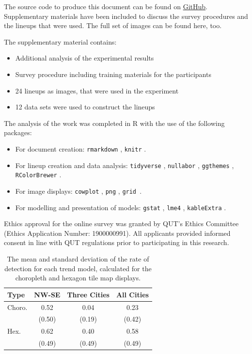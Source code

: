 \documentclass[times, doublespace]{anzsauth}
\begin{document}
The source code to produce this document can be found on
\href{https://github.com/srkobakian/experiment/paper}{GitHub}.
Supplementary materials have been included to discuss the survey
procedures and the lineups that were used. The full set of images can be
found here, too.

The supplementary material contains:

\begin{itemize}
 \item
  Additional analysis of the experimental results
\item
  Survey procedure including training materials for the participants
\item
  24 lineups as images, that were used in the experiment
\item
  12 data sets were used to construct the lineups
\end{itemize}

The analysis of the work was completed in R
\citep{RCore} with the use of the following packages:

\begin{itemize}
 \item
  For document creation:  \texttt{rmarkdown} \citep{rmarkdown},
   \texttt{knitr}
  \citep{knitr}.
\item
  For lineup creation and data analysis:  \texttt{tidyverse}
  \citep{tidyverse},  \texttt{nullabor}
  \citep{nullabor},  \texttt{ggthemes}
  \citep{ggthemes},  \texttt{RColorBrewer}
 \citep{RColorBrewer}.
\item
  For image displays:  \texttt{cowplot} \citep{cowplot},  \texttt{png}
  \citep{png},  \texttt{grid }\citep{grid}.
\item
  For modelling and presentation of models:  \texttt{gstat}
 \citep{gstat},  \texttt{lme4} \citep{lme4},
   \texttt{kableExtra} \citep{kableExtra}.
\end{itemize}

Ethics approval for the online survey was granted by QUT's Ethics
Committee (Ethics Application Number: 1900000991). All applicants
provided informed consent in line with QUT regulations prior to
participating in this research.




\newpage

\begin{table}[t]

\caption{\label{tab:desc-stats}The mean and standard deviation of the rate of detection for each trend model, calculated for the choropleth and hexagon tile map displays.}
\centering
\begin{tabular}[t]{lccc}
\toprule
Type & NW-SE & Three Cities & All Cities\\
\midrule
Choro. & 0.52 & 0.04 & 0.23\\
 & (0.50) & (0.19) & (0.42)\\
\addlinespace
Hex. & 0.62 & 0.40 & 0.58\\
 & (0.49) & (0.49) & (0.49)\\
\bottomrule
\end{tabular}
\end{table}
\end{document}
